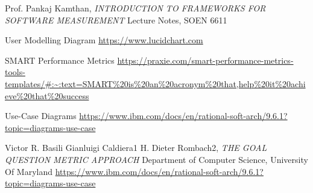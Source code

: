 \documentclass[letterpaper]{report}
\begin{document}
\clearpage %
\begin{thebibliography}{. . .}
Prof. Pankaj Kamthan,
\textit{INTRODUCTION TO FRAMEWORKS FOR SOFTWARE MEASUREMENT }
Lecture Notes, SOEN 6611

User Modelling Diagram
\url{https://www.lucidchart.com}

SMART Performance Metrics
\url{https://praxie.com/smart-performance-metrics-tools-templates/#:~:text=SMART%20is%20an%20acronym%20that,help%20it%20achieve%20that%20success}

Use-Case Diagrams
\url{https://www.ibm.com/docs/en/rational-soft-arch/9.6.1?topic=diagrams-use-case}

Victor R. Basili   Gianluigi Caldiera1   H. Dieter Rombach2,
\textit{THE GOAL QUESTION METRIC APPROACH }
Department of Computer Science, University Of Maryland
\url{https://www.ibm.com/docs/en/rational-soft-arch/9.6.1?topic=diagrams-use-case}

\end{thebibliography}
\end{document}
